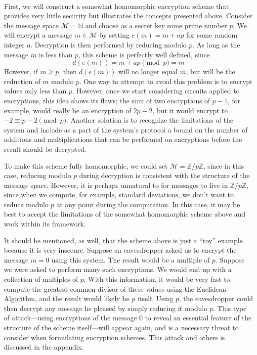 \documentclass[11pt]{report}
\newcommand{\N}{\mathbb{N}}
\newcommand{\M}{\mathcal{M}}
\newcommand{\Zp}{\mathbb{Z}/p\mathbb{Z}}
\begin{document}
\

First, we will construct a somewhat homomorphic encryption scheme that provides very little security but illustrates the concepts presented above. Consider the message space $\M = \N$ and choose as a secret key some prime number $p$. We will encrypt a message $m\in \M$ by setting $e(m) = m+ap$ for some random integer $a$. Decryption is then performed by reducing modulo $p$. As long as the message $m$ is less than $p$, this scheme is perfectly well defined, since \[d(e(m)) = m+ap \pmod{p} = m\] However, if $m\geq p$, then $d(e(m))$ will no longer equal $m$, but will be the reduction of $m$ modulo $p$. One way to attempt to avoid this problem is to encrypt values only less than $p$. However, once we start considering circuits applied to encryptions, this idea shows its flaws; the sum of two encryptions of $p-1$, for example, would really be an encryption of $2p-2$, but it would encrypt to $-2 \equiv p-2 \pmod{p}$. Another solution is to recognize the limitations of the system and include as a part of the system's protocol a bound on the number of additions and multiplications that can be performed on encryptions before the result should be decrypted. 

To make this scheme fully homomorphic, we could set $\M = \Zp$, since in this case, reducing modulo $p$ during decryption is consistent with the structure of the message space. However, it is perhaps unnatural to for messages to live in $\Zp$, since when we compute, for example, standard deviations, we don't want to reduce modulo $p$ at any point during the computation. In this case, it may be best to accept the limitations of the somewhat homomorphic scheme above and work within its framework.

It should be mentioned, as well, that the scheme above is just a ``toy'' example because it is very insecure. Suppose an eavesdropper asked us to encrypt the message $m=0$ using this system. The result would be a multiple of $p$. Suppose we were asked to perform many such encryptions. We would end up with a collection of multiples of $p$. With this information, it would be very fast to compute the greatest common divisor of these values using the Euclidean Algorithm, and the result would likely be $p$ itself. Using $p$, the eavesdropper could then decrypt any message he pleased by simply reducing it modulo $p$. This type of attack---using encryptions of the message $0$ to reveal an essential feature of the structure of the scheme itself---will appear again, and is a necessary threat to consider when formulating encryption schemes. This attack and others is discussed in the appendix.
\end{document}
